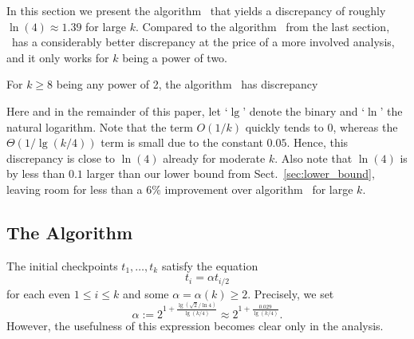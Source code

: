 In this section we present the algorithm \AlgJakub\ that yields a discrepancy of roughly $\ln(4) \approx 1.39$ for large $k$. Compared to the algorithm \AlgKarl\ from the last section, \AlgJakub\ has a considerably better discrepancy at the price of a more involved analysis, and it only works for $k$ being a power of two. 

\begin{theorem} \label{thm:algjacub}
  For $k\ge 8$ being any power of 2, the algorithm \AlgJakub\ has discrepancy
\end{theorem}
Here and in the remainder of this paper, let `$\lg$' denote the binary and `$\ln$' the natural logarithm. Note that the term $O(1/k)$ quickly tends to 0, whereas the $\Theta(1/\lg(k/4))$ term is small due to the constant $0.05$. Hence, this discrepancy is close to $\ln(4)$ already for moderate $k$. Also note that $\ln(4)$ is by less than $0.1$ larger than our lower bound from Sect.~\ref{sec:lower_bound}, leaving room for less than a $6\%$ improvement over algorithm \AlgJakub\ for large $k$. 

\subsection{The Algorithm \AlgJakub} 

The initial checkpoints $t_1,\ldots,t_k$ satisfy the equation
\begin{equation} \label{eq:tialpha}
  t_i = \alpha t_{i/2} 
\end{equation}
for each even $1 \le i \le k$ and some $\alpha = \alpha(k) \ge 2$. Precisely, we set
\[
  \alpha := 2^{1 + \frac{\lg(\sqrt{2}/\ln 4)}{\lg(k/4)} } \approx 2^{1+ \frac{0.029}{\lg(k/4)}}.
\]
However, the usefulness of this expression becomes clear only in the analysis.

